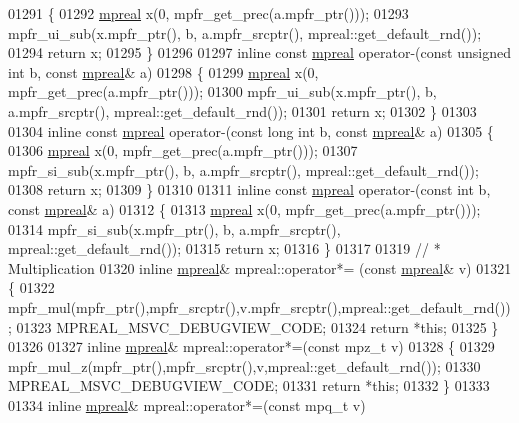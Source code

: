 \begin{DoxyCode}
01291 \{
01292     \hyperlink{classmpfr_1_1mpreal}{mpreal} x(0, mpfr\_get\_prec(a.mpfr\_ptr()));
01293     mpfr\_ui\_sub(x.mpfr\_ptr(), b, a.mpfr\_srcptr(), mpreal::get\_default\_rnd());
01294     \textcolor{keywordflow}{return} x;
01295 \}
01296 
01297 \textcolor{keyword}{inline} \textcolor{keyword}{const} \hyperlink{classmpfr_1_1mpreal}{mpreal} operator-(\textcolor{keyword}{const} \textcolor{keywordtype}{unsigned} \textcolor{keywordtype}{int} b, \textcolor{keyword}{const} \hyperlink{classmpfr_1_1mpreal}{mpreal}& a)
01298 \{
01299     \hyperlink{classmpfr_1_1mpreal}{mpreal} x(0, mpfr\_get\_prec(a.mpfr\_ptr()));
01300     mpfr\_ui\_sub(x.mpfr\_ptr(), b, a.mpfr\_srcptr(), mpreal::get\_default\_rnd());
01301     \textcolor{keywordflow}{return} x;
01302 \}
01303 
01304 \textcolor{keyword}{inline} \textcolor{keyword}{const} \hyperlink{classmpfr_1_1mpreal}{mpreal} operator-(\textcolor{keyword}{const} \textcolor{keywordtype}{long} \textcolor{keywordtype}{int} b, \textcolor{keyword}{const} \hyperlink{classmpfr_1_1mpreal}{mpreal}& a)
01305 \{
01306     \hyperlink{classmpfr_1_1mpreal}{mpreal} x(0, mpfr\_get\_prec(a.mpfr\_ptr()));
01307     mpfr\_si\_sub(x.mpfr\_ptr(), b, a.mpfr\_srcptr(), mpreal::get\_default\_rnd());
01308     \textcolor{keywordflow}{return} x;
01309 \}
01310 
01311 \textcolor{keyword}{inline} \textcolor{keyword}{const} \hyperlink{classmpfr_1_1mpreal}{mpreal} operator-(\textcolor{keyword}{const} \textcolor{keywordtype}{int} b, \textcolor{keyword}{const} \hyperlink{classmpfr_1_1mpreal}{mpreal}& a)
01312 \{
01313     \hyperlink{classmpfr_1_1mpreal}{mpreal} x(0, mpfr\_get\_prec(a.mpfr\_ptr()));
01314     mpfr\_si\_sub(x.mpfr\_ptr(), b, a.mpfr\_srcptr(), mpreal::get\_default\_rnd());
01315     \textcolor{keywordflow}{return} x;
01316 \}
01317 
01319 \textcolor{comment}{// * Multiplication}
01320 \textcolor{keyword}{inline} \hyperlink{classmpfr_1_1mpreal}{mpreal}& mpreal::operator*= (\textcolor{keyword}{const} \hyperlink{classmpfr_1_1mpreal}{mpreal}& v)
01321 \{
01322     mpfr\_mul(mpfr\_ptr(),mpfr\_srcptr(),v.mpfr\_srcptr(),mpreal::get\_default\_rnd());
01323     MPREAL\_MSVC\_DEBUGVIEW\_CODE;
01324     \textcolor{keywordflow}{return} *\textcolor{keyword}{this};
01325 \}
01326 
01327 \textcolor{keyword}{inline} \hyperlink{classmpfr_1_1mpreal}{mpreal}& mpreal::operator*=(\textcolor{keyword}{const} mpz\_t v)
01328 \{
01329     mpfr\_mul\_z(mpfr\_ptr(),mpfr\_srcptr(),v,mpreal::get\_default\_rnd());
01330     MPREAL\_MSVC\_DEBUGVIEW\_CODE;
01331     \textcolor{keywordflow}{return} *\textcolor{keyword}{this};
01332 \}
01333 
01334 \textcolor{keyword}{inline} \hyperlink{classmpfr_1_1mpreal}{mpreal}& mpreal::operator*=(\textcolor{keyword}{const} mpq\_t v)

\end{DoxyCode}
